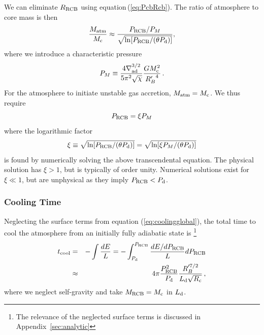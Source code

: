 \documentclass[apj]{emulateapj}
\newcommand{\delad}{\nabla_{\rm ad}}
\newcommand{\Eq}[1]{equation\,(\ref{#1})}
\newcommand{\App}[1]{Appendix~\ref{#1}}
\newcommand{\co}{_{\rm c}}
\newcommand{\di}{_{\rm d}}
\newcommand{\cb}{_{\rm RCB}}
\begin{document}
We can eliminate $R\cb$ using \Eq{eq:PcbRcb}.  The ratio of atmosphere to core mass is then  
\begin{equation} \label{eq:crit}
{M_{\rm atm} \over M\co} \approx {P\cb /P_M \over  \sqrt{\ln[ P\cb/(\theta P_{\rm d})]}},
\end{equation} 
where we introduce a characteristic pressure
\begin{equation} 
P_M \equiv {4 \delad^{3/2} \over 5 \pi^2 \sqrt{\chi} } {G M\co^2 \over {R_B'}^4}\, .
\end{equation} 
For the atmosphere to initiate unstable gas accretion, $M_{\rm atm} = M\co$. We thus require
\begin{equation} \label{eq:Pcbc}
P\cb = \xi P_M
\end{equation} 
where  the logarithmic factor
\begin{equation}\label{eq:xi}
\xi \equiv \sqrt{\ln[ P\cb/(\theta P_{\rm d})]} = \sqrt{\ln[ \xi P_M / (\theta P_{\rm d})]}
\end{equation} 
is found by numerically solving the above transcendental equation. The physical solution has $\xi >1$, but is typically of order unity. Numerical solutions exist for $\xi \ll 1$, but are unphysical as they imply $P\cb < P_{\rm d}$.

\subsubsection{Cooling Time}
Neglecting the surface terms from equation (\ref{eq:coolingglobal}), the total time to cool the atmosphere from an initially fully adiabatic state is \footnote{The relevance of the neglected surface terms is discussed in \App{sec:analytic}}
\begin{eqnarray} 
t_{\rm  cool} &=& -\int {d E \over L} = - \int_{P\di}^{P\cb } {d E/d P\cb \over L} dP\cb \\
&\approx& 4 \pi {P\cb^{2} \over P\di} {R_B'^{7/2} \over L\di \sqrt{R\co}} \label{eq:tcool}\, ,
\end{eqnarray} 
where we neglect self-gravity and take $M\cb = M\co$ in $L\di$.
\end{document}
